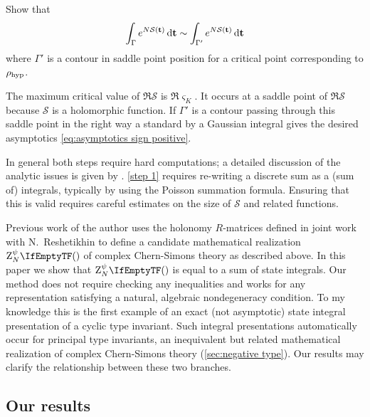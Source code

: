 \documentclass[margincite, leqno]{sl2art}
\numberwithin{equation}{section}
\begin{document}
\begin{step}
  \label{step 2}
  Show that
  \[
    \int_{\Gamma} e^{N \mathcal{S}(\mathbf{t})} \,\mathrm{d} \mathbf{t}
    \sim
    \int_{\Gamma'} e^{N \mathcal{S}(\mathbf{t})} \,\mathrm{d} \mathbf{t}
  \]
  where \(\Gamma'\) is a contour in saddle point position for a
  critical point corresponding to \(\rho_{\operatorname{hyp}}\).
\end{step}

The maximum critical value of \(\Re \mathcal{S}\) is \(\Re \varsigma_{K}\).
It occurs at a saddle point of \(\Re \mathcal{S}\) because
\(\mathcal{S}\) is a holomorphic function.
If \(\Gamma'\) is a contour passing through this saddle point in the
right way a standard  by a
Gaussian integral gives the desired asymptotics \eqref{eq:asymptotics
sign positive}.

In general both steps require hard computations; a detailed
discussion of the analytic issues is given by
\citeauthor{zbMATH06684922} \cite{zbMATH06684922}.
\cref{step 1} requires re-writing a discrete sum as a (sum of)
integrals, typically by using the Poisson summation formula.
Ensuring that this is valid requires careful estimates on the size of
\(\mathcal{S}\) and related functions.

Previous work of the author \cite{McPhailSnyderVolume} uses the
holonomy \(R\)-matrices defined in joint work with N.\ Reshetikhin
\cite{McPhailSnyderAlgebra} to define a candidate mathematical
realization \(\qinv{}\) of complex Chern-Simons theory as described above.
In this paper we show that \(\qinv{}\) is equal to a sum of state integrals.
Our method does not require checking any inequalities and works for
any representation satisfying a natural, algebraic nondegeneracy condition.
To my knowledge this is the first example of an exact (not
asymptotic) state integral presentation of a cyclic type invariant.
Such integral presentations automatically occur for principal type
invariants, an inequivalent but related mathematical realization of
complex Chern-Simons theory (\cref{sec:negative type}).
Our results may clarify the relationship between these two branches.

\subsection{Our results}%
\label{sec:Our results}
\end{document}
